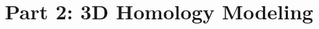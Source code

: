 \documentclass{beamer}
\newcommand\blfootnote[1]{%
  \begingroup
  \renewcommand\thefootnote{}\footnote{#1}%
  \addtocounter{footnote}{-1}%
  \endgroup
}
\begin{document}
%


\section{Part 2: 3D Homology Modeling}
\end{document}
